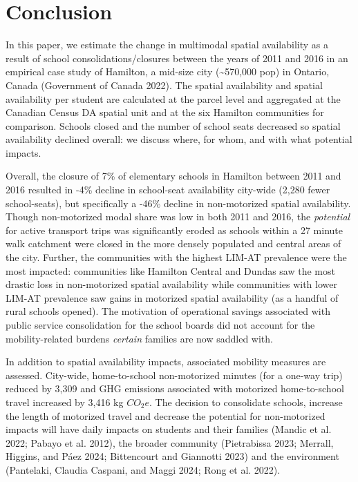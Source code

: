 \documentclass[
default
]{sn-jnl}
\begin{document}
\section{Conclusion}\label{conclusion}

In this paper, we estimate the change in multimodal spatial availability
as a result of school consolidations/closures between the years of 2011
and 2016 in an empirical case study of Hamilton, a mid-size city
(\textasciitilde570,000 pop) in Ontario, Canada (Government of Canada
2022). The spatial availability and spatial availability per student are
calculated at the parcel level and aggregated at the Canadian Census DA
spatial unit and at the six Hamilton communities for comparison. Schools
closed and the number of school seats decreased so spatial availability
declined overall: we discuss where, for whom, and with what potential
impacts.

Overall, the closure of 7\% of elementary schools in Hamilton between
2011 and 2016 resulted in -4\% decline in school-seat availability
city-wide (2,280 fewer school-seats), but specifically a -46\% decline
in non-motorized spatial availability. Though non-motorized modal share
was low in both 2011 and 2016, the \emph{potential} for active transport
trips was significantly eroded as schools within a 27 minute walk
catchment were closed in the more densely populated and central areas of
the city. Further, the communities with the highest LIM-AT prevalence
were the most impacted: communities like Hamilton Central and Dundas saw
the most drastic loss in non-motorized spatial availability while
communities with lower LIM-AT prevalence saw gains in motorized spatial
availability (as a handful of rural schools opened). The motivation of
operational savings associated with public service consolidation for the
school boards did not account for the mobility-related burdens
\emph{certain} families are now saddled with.

In addition to spatial availability impacts, associated mobility
measures are assessed. City-wide, home-to-school non-motorized minutes
(for a one-way trip) reduced by 3,309 and GHG emissions associated with
motorized home-to-school travel increased by 3,416 kg \(CO_2e\). The
decision to consolidate schools, increase the length of motorized travel
and decrease the potential for non-motorized impacts will have daily
impacts on students and their families (Mandic et al. 2022; Pabayo et
al. 2012), the broader community (Pietrabissa 2023; Merrall, Higgins,
and Páez 2024; Bittencourt and Giannotti 2023) and the environment
(Pantelaki, Claudia Caspani, and Maggi 2024; Rong et al. 2022).
\end{document}
